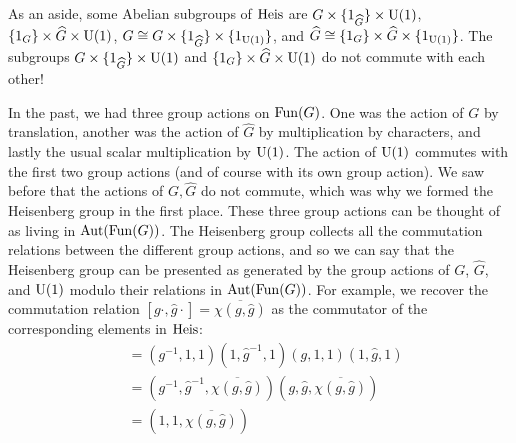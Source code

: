 \documentclass[../../rtnotes.tex]{subfiles}
\begin{document}
As an aside, some Abelian subgroups of $\operatorname{Heis}$ are $G\times \{1_{\widehat G}\}\times \operatorname{U}(1)$, $\{1_G\}\times\widehat G\times \operatorname{U}(1)$, $G\cong G\times\{1_{\widehat G}\}\times \{1_{\operatorname{U}(1)}\}$, and $\widehat G\cong \{1_G\}\times \widehat G\times \{1_{\operatorname{U}(1)}\}$. The subgroups  $G\times \{1_{\widehat G}\}\times \operatorname{U}(1)$ and $\{1_G\}\times\widehat G\times \operatorname{U}(1)$ do not commute with each other!

In the past, we had three group actions on $\operatorname{Fun}(G)$. One was the action of $G$ by translation, another was the action of $\widehat G$ by multiplication by characters, and lastly the usual scalar multiplication by $\operatorname{U}(1)$. The action of $\operatorname{U}(1)$ commutes with the first two group actions (and of course with its own group action). We saw before that the actions of $G,\widehat G$ do not commute, which was why we formed the Heisenberg group in the first place. These three group actions can be thought of as living in $\operatorname{Aut}(\operatorname{Fun}(G))$. The Heisenberg group collects all the commutation relations between the different group actions, and so we can say that the Heisenberg group can be presented as generated by the group actions of $G$, $\widehat G$, and $\operatorname{U}(1)$ modulo their relations in $\operatorname{Aut}(\operatorname{Fun}(G))$. For example, we recover the commutation relation $[g\cdot,\hat g\cdot] = \overline{\chi(g,\hat g)}$ as the commutator of the corresponding elements in $\operatorname{Heis}$:
\begin{align*}
    [(g,1,1),(1,\hat g,1)] &= (g^{-1},1,1)(1,\hat g^{-1},1)(g,1,1)(1,\hat g,1)\\
    &= (g^{-1},\hat g^{-1},\overline{\chi(g,\hat g)})(g,\hat g,\overline{\chi(g,\hat g)})\\
    &= (1,1,\overline{\chi(g,\hat g)})
\end{align*}
\end{document}

